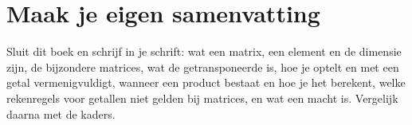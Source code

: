 
\ifzelfstudie
\section*{Maak je eigen samenvatting}
Sluit dit boek en schrijf in je schrift: wat een matrix, een element en de dimensie zijn, de bijzondere matrices, wat de getransponeerde is, hoe je optelt en met een getal vermenigvuldigt, wanneer een product bestaat en hoe je het berekent, welke rekenregels voor getallen niet gelden bij matrices, en wat een macht is. Vergelijk daarna met de kaders.
\fi
